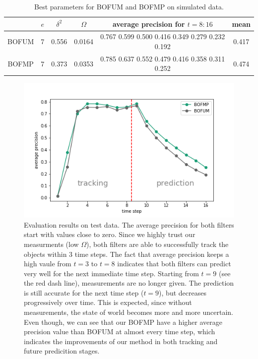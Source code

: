 \begin{table}[H]
\centering  
\begin{tabularx}{\textwidth}{c|c|c|c|c|c}
    \hline
    & $ e $ & $ \delta^2 $ & $ \Omega $ & average precision for $t=8:16 $ & mean\\ \hline
    BOFUM & 7 & 0.556 & 0.0164 &  0.767  0.599  0.500    0.416  0.349  0.279  0.232  0.192 & 0.417 \\
    BOFMP & 7 & 0.373 & 0.0353 & 0.785  0.637  0.552  0.479  0.416  0.358  0.311  0.252 & 0.474 \\
   \hline
  \end{tabularx}
\label{table:best_param_simulated}
\caption{Best parameters for BOFUM and BOFMP on simulated data.}
\end{table}


\begin{figure}[ht]
  \centering
   \captionsetup{width=\linewidth}
    \includegraphics[width=.8\textwidth]{figures/test_on_simulated_data.png}
    \caption{Evaluation results on test data. The average precision for both filters start with values close to zero. Since we highly trust our measurments (low $\Omega$), both filters are able to successfully track the objects within 3 time steps. The fact that average precision keeps a high vaule from $t=3$ to $t=8$ indicates that both filters can predict very well for the next immediate time step. Starting from $t=9$ (see the red dash line), measurements are no longer given. The prediction is still accurate for the next time step ($t=9$), but decreases progressively over time.  This is expected, since without measurements, the state of world becomes more and more uncertain. Even though, we can see that our BOFMP have a higher average precision value than BOFUM at almost every time step, which indicates the improvements of our method in both tracking and future predicition stages.}
    \label{fig:simulated_test_data}
\end{figure}


